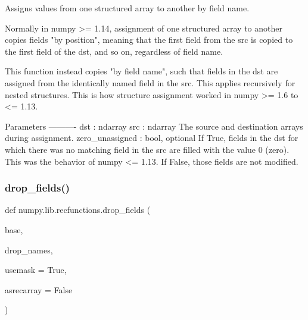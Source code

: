 \begin{DoxyVerb}Assigns values from one structured array to another by field name.

Normally in numpy >= 1.14, assignment of one structured array to another
copies fields "by position", meaning that the first field from the src is
copied to the first field of the dst, and so on, regardless of field name.

This function instead copies "by field name", such that fields in the dst
are assigned from the identically named field in the src. This applies
recursively for nested structures. This is how structure assignment worked
in numpy >= 1.6 to <= 1.13.

Parameters
----------
dst : ndarray
src : ndarray
    The source and destination arrays during assignment.
zero_unassigned : bool, optional
    If True, fields in the dst for which there was no matching
    field in the src are filled with the value 0 (zero). This
    was the behavior of numpy <= 1.13. If False, those fields
    are not modified.
\end{DoxyVerb}
 \mbox{\label{namespacenumpy_1_1lib_1_1recfunctions_a9d7d4636850989f9f106bb09d8512b53}} 
\subsubsection{\texorpdfstring{drop\+\_\+fields()}{drop\_fields()}}
{\footnotesize\ttfamily def numpy.\+lib.\+recfunctions.\+drop\+\_\+fields (\begin{DoxyParamCaption}\item[{}]{base,  }\item[{}]{drop\+\_\+names,  }\item[{}]{usemask = {\ttfamily True},  }\item[{}]{asrecarray = {\ttfamily False} }\end{DoxyParamCaption})}

